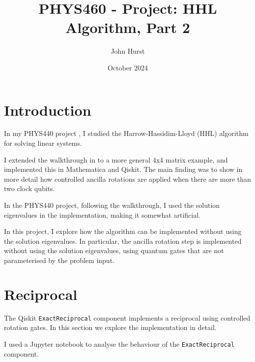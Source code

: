 \documentclass[12pt]{extarticle}
\title{PHYS460 - Project: HHL Algorithm, Part 2}
\author{John Hurst}
\date{October 2024}
\begin{document}
\maketitle

\tableofcontents

\newpage

\section{Introduction}

In my PHYS440 project \cite{github_project_hhl}, I studied the Harrow-Hassidim-Lloyd (HHL) algorithm for solving linear systems.

I extended the walkthrough in \cite{zaman2023step} to a more general 4x4 matrix example, and implemented this in Mathematica and Qiskit.
The main finding was to show in more detail how controlled ancilla rotations are applied when there are more than two clock qubits.

In the PHYS440 project, following the walkthrough, I used the solution eigenvalues in the implementation,
making it somewhat artificial.

In this project, I explore how the algorithm can be implemented without using the solution eigenvalues.
In particular, the ancilla rotation step is implemented without using the solution eigenvalues,
using quantum gates that are not parameterised by the problem input.

\section{Reciprocal}\label{sec:reciprocal}

The Qiskit \texttt{ExactReciprocal} component \cite{ibm_exact_reciprocal} implements a reciprocal using controlled rotation gates.
In this section we explore the implementation in detail.

I used a Jupyter notebook \cite{github_project_exactreciprocal_matrix} to analyse the behaviour of the \texttt{ExactReciprocal} component.
\end{document}
